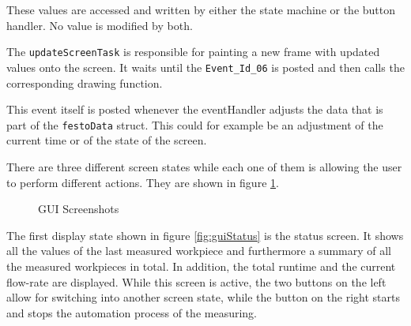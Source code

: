 These values are accessed and written by either the state machine or the button handler. No value is modified by both. 


The \texttt{updateScreenTask} is responsible for painting a new frame with updated values onto the screen.
It waits until the \texttt{Event\_Id\_06} is posted and then calls the corresponding drawing function.

This event itself is posted whenever the eventHandler adjusts the data that is part of the \texttt{festoData} struct.
This could for example be an adjustment of the current time or of the state of the screen.

There are three different screen states while each one of them is allowing the user to perform different actions. They are shown in figure \ref{fig:gui}.

\begin{figure} [H] 	
	\begin{center}
		\quad
		\quad
		\caption{GUI Screenshots}
		\label{fig:gui}
	\end{center}
\end{figure} 

The first display state shown in figure \ref{fig:guiStatus} is the status screen.
It shows all the values of the last measured workpiece and furthermore a summary of all the measured workpieces in total.
In addition, the total runtime and the current flow-rate are displayed.
While this screen is active, the two buttons on the left allow for switching into another screen state, while the button on the right starts and stops the automation process of the measuring.

